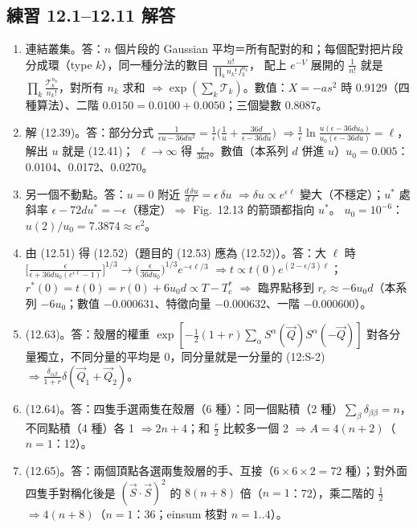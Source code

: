 \subsection{練習 12.1--12.11 解答}
{\small
\begin{enumerate}[label=\textbf{12.\arabic*},itemsep=0.05em]
\item 連結叢集。\quad 答：$n$ 個片段的 Gaussian 平均＝所有配對的和；每個配對把片段分成環（type $k$），同一種分法的數目 $\frac{n!}{\prod_kn_k!\,f_k^{n_k}}$，
配上 $e^{-V}$ 展開的 $\frac1{n!}$ 就是 $\prod_k\frac{\mathcal T_k^{n_k}}{n_k!}$，對所有 $n_k$ 求和 $\Rightarrow\exp(\sum_k\mathcal T_k)$。數值：$X=-as^2$ 時 0.9129（四種算法）、二階 $0.0150=0.0100+0.0050$；三個變數 0.8087。
\item 解 (12.39)。\quad 答：部分分式 $\frac1{\epsilon u-36du^2}=\frac1\epsilon\big(\frac1u+\frac{36d}{\epsilon-36du}\big)$ $\Rightarrow\frac1\epsilon\ln\frac{u(\epsilon-36du_0)}{u_0(\epsilon-36du)}=\ell$，解出 $u$ 就是 (12.41)；
$\ell\to\infty$ 得 $\frac\epsilon{36d}$。數值（本系列 $d$ 併進 $u$）$u_0=0.005$：0.0104、0.0172、0.0270。
\item 另一個不動點。\quad 答：$u=0$ 附近 $\frac{d\,\delta u}{d\ell}=\epsilon\,\delta u$ $\Rightarrow\delta u\propto e^{\epsilon\ell}$ 變大（不穩定）；$u^*$ 處斜率 $\epsilon-72du^*=-\epsilon$（穩定）$\Rightarrow$ Fig.~12.13 的箭頭都指向 $u^*$。
$u_0=10^{-6}$：$u(2)/u_0=7.3874\approx e^2$。
\item 由 (12.51) 得 (12.52)（題目的 (12.53) 應為 (12.52)）。\quad 答：大 $\ell$ 時 $\big[\frac\epsilon{\epsilon+36du_0(e^{\epsilon\ell}-1)}\big]^{1/3}\to\big(\frac\epsilon{36du_0}\big)^{1/3}e^{-\epsilon\ell/3}$ $\Rightarrow t\propto t(0)e^{(2-\epsilon/3)\ell}$；
$r^*(0)=t(0)=r(0)+6u_0d\propto T-T_c^*$ $\Rightarrow$ 臨界點移到 $r_c\approx-6u_0d$（本系列 $-6u_0$；數值 $-0.000631$、特徵向量 $-0.000632$、一階 $-0.000600$）。
\item (12.63)。\quad 答：殼層的權重 $\exp[-\frac12(1+r)\sum_\alpha S^\alpha(\vec Q)S^\alpha(-\vec Q)]$ 對各分量獨立，不同分量的平均是 0，同分量就是一分量的 (12:S-2) $\Rightarrow\frac{\delta_{\alpha\beta}}{1+r}\delta(\vec Q_1+\vec Q_2)$。
\item (12.64)。\quad 答：四隻手選兩隻在殼層（6 種）：同一個點積（2 種）$\sum_\beta\delta_{\beta\beta}=n$，不同點積（4 種）各 1 $\Rightarrow2n+4$；和 $\frac r2$ 比較多一個 2 $\Rightarrow A=4(n+2)$（$n=1$：12）。
\item (12.65)。\quad 答：兩個頂點各選兩隻殼層的手、互接（$6\times6\times2=72$ 種）；對外面四隻手對稱化後是 $(\vec S\cdot\vec S)^2$ 的 $8(n+8)$ 倍（$n=1$：72），乘二階的 $\frac12$ $\Rightarrow4(n+8)$（$n=1$：36；einsum 核對 $n=1..4$）。

\end{enumerate}}
